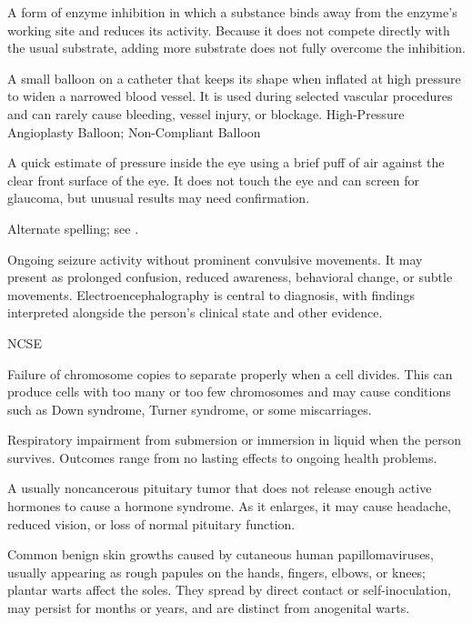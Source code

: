  A form of enzyme inhibition in which a substance binds away from the enzyme’s working site and reduces its activity. Because it does not compete directly with the usual substrate, adding more substrate does not fully overcome the inhibition.

 A small balloon on a catheter that keeps its shape when inflated at high pressure to widen a narrowed blood vessel. It is used during selected vascular procedures and can rarely cause bleeding, vessel injury, or blockage.
\synonyms
High-Pressure Angioplasty Balloon; Non-Compliant Balloon

 A quick estimate of pressure inside the eye using a brief puff of air against the clear front surface of the eye. It does not touch the eye and can screen for glaucoma, but unusual results may need confirmation.

 Alternate spelling; see .

 Ongoing seizure activity without prominent convulsive movements. It may present as prolonged confusion, reduced awareness, behavioral change, or subtle movements. Electroencephalography is central to diagnosis, with findings interpreted alongside the person's clinical state and other evidence.

\synonyms
NCSE

 Failure of chromosome copies to separate properly when a cell divides. This can produce cells with too many or too few chromosomes and may cause conditions such as Down syndrome, Turner syndrome, or some miscarriages.

 Respiratory impairment from submersion or immersion in liquid when the person survives. Outcomes range from no lasting effects to ongoing health problems.

 A usually noncancerous pituitary tumor that does not release enough active hormones to cause a hormone syndrome. As it enlarges, it may cause headache, reduced vision, or loss of normal pituitary function.

 Common benign skin growths caused by cutaneous human papillomaviruses, usually appearing as rough papules on the hands, fingers, elbows, or knees; plantar warts affect the soles. They spread by direct contact or self-inoculation, may persist for months or years, and are distinct from anogenital warts.

